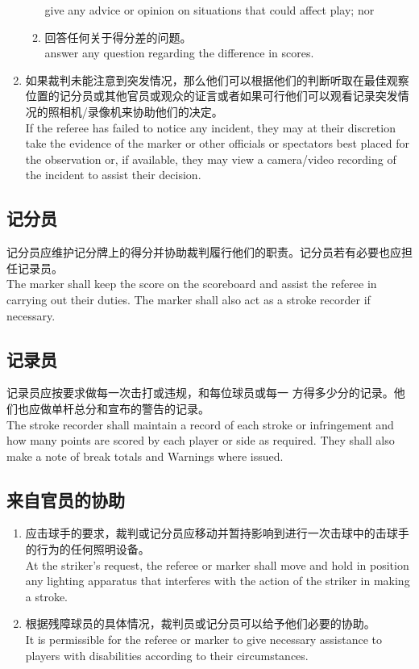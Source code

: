 \begin{enumerate}[label=(\alph*)]
\begin{enumerate}[label=(\roman*)]
        give any advice or opinion on situations that could affect play; nor
        \item 回答任何关于得分差的问题。\\
        answer any question regarding the difference in scores.
    \end{enumerate}
    \item 如果裁判未能注意到突发情况，那么他们可以根据他们的判断听取在最佳观察位置的记分员或其他官员或观众的证言或者如果可行他们可以观看记录突发情况的照相机/录像机来协助他们的决定。\\
    If the referee has failed to notice any incident, they may at their discretion take the evidence of the marker or other officials or spectators best placed for the observation or, if available, they may view a camera/video recording of the incident to assist their decision.
\end{enumerate}

\subsection{记分员}

\noindent 记分员应维护记分牌上的得分并协助裁判履行他们的职责。记分员若有必要也应担任记录员。\\
The marker shall keep the score on the scoreboard and assist the referee in carrying out their duties. The marker shall also act as a stroke recorder if necessary.

\subsection{记录员}

\noindent 记录员应按要求做每一次击打或违规，和每位球员或每一
方得多少分的记录。他们也应做单杆总分和宣布的警告的记录。\\
The stroke recorder shall maintain a record of each stroke or infringement and how many points are scored by each player or side as required. They shall also make a note of break totals and Warnings where issued.

\subsection{来自官员的协助}

\begin{enumerate}[label=(\alph*)]
    \item 应击球手的要求，裁判或记分员应移动并暂持影响到进行一次击球中的击球手的行为的任何照明设备。\\
    At the striker's request, the referee or marker shall move and hold in position any lighting apparatus that interferes with the action of the striker in making a stroke.
    \item 根据残障球员的具体情况，裁判员或记分员可以给予他们必要的协助。\\
    It is permissible for the referee or marker to give necessary assistance to players with disabilities according to their circumstances.
\end{enumerate}
